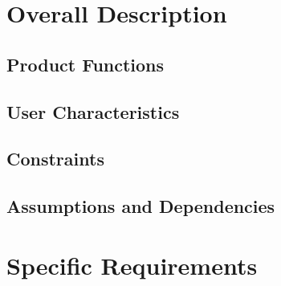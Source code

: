 \documentclass[12pt]{article}
\begin{document}
	\section{Overall Description}	
	\subsection{Product Functions}
	\subsection{User Characteristics}
	\subsection{Constraints}
	\subsection{Assumptions and Dependencies}
	\section{Specific Requirements}
\end{document}
